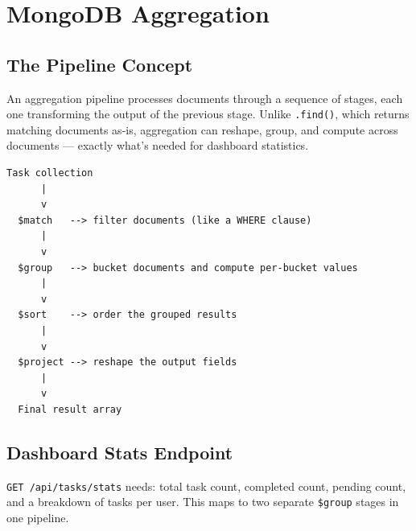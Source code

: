 \chapter{MongoDB Aggregation}

\section{The Pipeline Concept}

An aggregation pipeline processes documents through a sequence of stages,
each one transforming the output of the previous stage. Unlike
\texttt{.find()}, which returns matching documents as-is, aggregation can
reshape, group, and compute across documents --- exactly what's needed for
dashboard statistics.

\begin{diagrambox}
\begin{verbatim}
Task collection
      |
      v
  $match   --> filter documents (like a WHERE clause)
      |
      v
  $group   --> bucket documents and compute per-bucket values
      |
      v
  $sort    --> order the grouped results
      |
      v
  $project --> reshape the output fields
      |
      v
  Final result array
\end{verbatim}
\end{diagrambox}

\section{Dashboard Stats Endpoint}

\texttt{GET /api/tasks/stats} needs: total task count, completed count,
pending count, and a breakdown of tasks per user. This maps to two separate
\texttt{\$group} stages in one pipeline.

